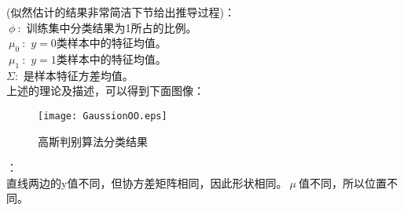 (似然估计的结果非常简洁下节给出推导过程)：\\
$~\phi~$:~训练集中分类结果为1所占的比例。\\
$~\mu_0~$:~$y=0$类样本中的特征均值。\\
$~\mu_1~$:~$y=1$类样本中的特征均值。\\
$\Sigma$:~是样本特征方差均值。\\

 上述的理论及描述，可以得到下面图像：\\
\begin{figure}[!htbp]
  \centering
  \texttt{[image: GaussionOO.eps]}
  \caption{高斯判别算法分类结果}
\end{figure}

：\\
直线两边的y值不同，但协方差矩阵相同，因此形状相同。$~\mu~$值不同，所以位置不同。

